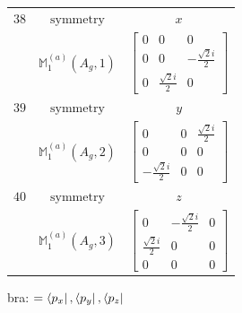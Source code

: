 \documentclass[fleqn,8pt,landscape]{jsarticle}
\begin{document}
\begin{longtable}{ccc}
$ 38 $ & $ \text{symmetry} $ & $ x $ \\
$  $ & $ \mathbb{M}_{1}^{(a)}(A_{g},1) $ & $ \begin{bmatrix} 0 & 0 & 0 \\ 0 & 0 & - \frac{\sqrt{2} i}{2} \\ 0 & \frac{\sqrt{2} i}{2} & 0 \end{bmatrix} $ \\ \hline
$ 39 $ & $ \text{symmetry} $ & $ y $ \\
$  $ & $ \mathbb{M}_{1}^{(a)}(A_{g},2) $ & $ \begin{bmatrix} 0 & 0 & \frac{\sqrt{2} i}{2} \\ 0 & 0 & 0 \\ - \frac{\sqrt{2} i}{2} & 0 & 0 \end{bmatrix} $ \\ \hline
$ 40 $ & $ \text{symmetry} $ & $ z $ \\
$  $ & $ \mathbb{M}_{1}^{(a)}(A_{g},3) $ & $ \begin{bmatrix} 0 & - \frac{\sqrt{2} i}{2} & 0 \\ \frac{\sqrt{2} i}{2} & 0 & 0 \\ 0 & 0 & 0 \end{bmatrix} $ \\ \hline
\end{longtable}
bra: $=\bra{p_{x}}, \bra{p_{y}}, \bra{p_{z}}$
\end{document}
